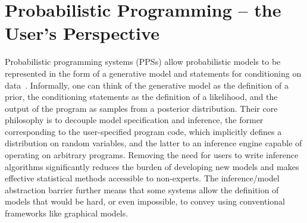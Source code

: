
\chapter{Probabilistic Programming -- the User's Perspective}
\label{chp:probprog}

Probabilistic programming systems (PPSs) allow probabilistic models to be represented in the 
form of a generative model and statements for conditioning on data~\citep{gordon2014probabilistic,goodman2008church}.  
Informally, one can think of the generative model as the definition of a prior, the conditioning 
statements as the definition of a likelihood, and the output of the program as samples from a posterior distribution. 
Their core philosophy is to decouple model specification and inference, the former 
corresponding to the user-specified program code, which implicitly 
defines a distribution on random variables, and the latter to an inference engine 
capable of operating on arbitrary programs.  Removing the need for users to write 
inference algorithms significantly reduces the burden of developing new models and 
makes effective statistical methods accessible to non-experts.  The inference/model abstraction barrier 
further means that some systems allow the definition of models that would be hard, or
even impossible, to convey using conventional frameworks like graphical models.


